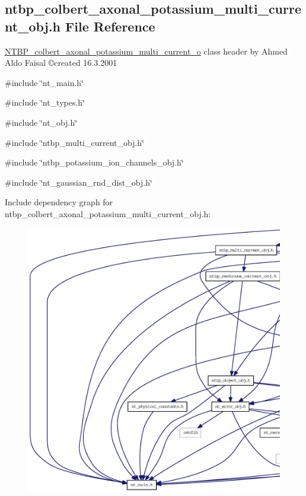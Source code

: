 \subsection{ntbp\_\-colbert\_\-axonal\_\-potassium\_\-multi\_\-current\_\-obj.h File Reference}
\label{ntbp__colbert__axonal__potassium__multi__current__obj_8h}



\begin{DoxyItemize}
\item \hyperlink{class_n_t_b_p__colbert__axonal__potassium__multi__current__o}{NTBP\_\-colbert\_\-axonal\_\-potassium\_\-multi\_\-current\_\-o} class header by Ahmed Aldo Faisal \copyright created 16.3.2001 
\end{DoxyItemize} 


{\ttfamily \#include \char`\"{}nt\_\-main.h\char`\"{}}\par
{\ttfamily \#include \char`\"{}nt\_\-types.h\char`\"{}}\par
{\ttfamily \#include \char`\"{}nt\_\-obj.h\char`\"{}}\par
{\ttfamily \#include \char`\"{}ntbp\_\-multi\_\-current\_\-obj.h\char`\"{}}\par
{\ttfamily \#include \char`\"{}ntbp\_\-potassium\_\-ion\_\-channels\_\-obj.h\char`\"{}}\par
{\ttfamily \#include \char`\"{}nt\_\-gaussian\_\-rnd\_\-dist\_\-obj.h\char`\"{}}\par
Include dependency graph for ntbp\_\-colbert\_\-axonal\_\-potassium\_\-multi\_\-current\_\-obj.h:
\nopagebreak
\begin{figure}[H]
\begin{center}
\leavevmode
\includegraphics[width=400pt]{ntbp__colbert__axonal__potassium__multi__current__obj_8h__incl}
\end{center}
\end{figure}
